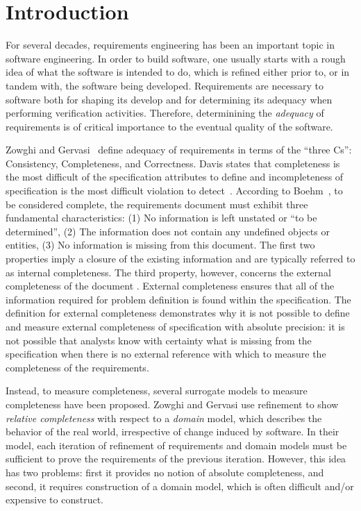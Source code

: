 \section{Introduction}
\label{sec:intro}


For several decades, requirements engineering has been an important topic in software engineering.  In order to build software, one usually starts with a rough idea of what the software is intended to do, which is refined either prior to, or in tandem with, the software being developed.  Requirements are necessary to software both for shaping its develop and for determining its adequacy when performing verification activities.  Therefore, determinining the {\em adequacy} of requirements is of critical importance to the eventual quality of the software.  

Zowghi and Gervasi~\cite{} define adequacy of requirements in terms of the ``three Cs'': Consistency, Completeness, and Correctness.   Davis states that completeness is the most difficult of the specification attributes to
define and incompleteness of specification is the most difficult violation to detect~\cite{}.
According to Boehm~\cite{}, to be considered complete, the requirements document must exhibit three fundamental characteristics: (1) No information is left unstated or ``to be determined'', (2) The information does not contain any undefined objects or entities, (3) No information is missing from this document. The first two properties imply a closure of the existing information and are typically referred to as internal completeness.  The third property, however, concerns the external completeness of the document
\cite{}. External completeness ensures that all of the information required for problem definition is found within the specification.   The definition for external completeness demonstrates why it is not possible to define and measure external completeness of specification with absolute precision: it is not possible that analysts know with certainty what is missing from the specification when there is no external reference with which to measure the completeness of the requirements.

Instead, to measure completeness, several surrogate models to measure completeness have been proposed.  Zowghi and Gervasi use refinement to show {\em relative completeness} with respect to a {\em domain} model, which describes the behavior of the real world, irrespective of change induced by software.  In their model, each iteration of refinement of requirements and domain models must be sufficient to prove the requirements of the previous iteration.  However, this idea has two problems: first it provides no notion of absolute completeness, and second, it requires construction of a domain model, which is often difficult and/or expensive to construct.

